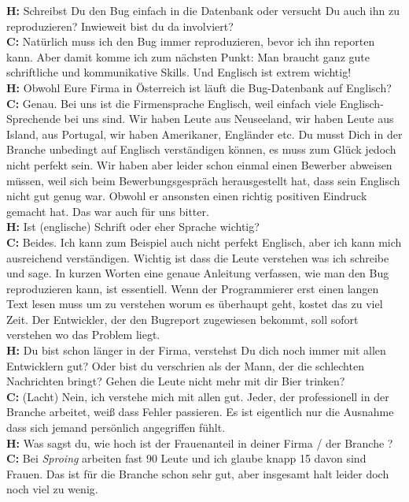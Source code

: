 \documentclass[10pt,a4paper,ngerman,twoside]{article} %
\begin{document}
\textbf{H:} Schreibst Du den Bug einfach in die Datenbank oder versucht Du auch ihn zu reproduzieren? Inwieweit bist du da involviert? \\
\textbf{C:} Natürlich muss ich den Bug immer reproduzieren, bevor ich ihn reporten kann. Aber damit komme ich zum nächsten Punkt: Man braucht ganz gute schriftliche und kommunikative Skills. Und Englisch ist extrem wichtig! \\
\textbf{H:} Obwohl Eure Firma in Österreich ist läuft die Bug-Datenbank auf Englisch?  \\
\textbf{C:} Genau. Bei uns ist die Firmensprache Englisch, weil einfach viele Englisch-Sprechende bei uns sind. Wir haben Leute aus Neuseeland, wir haben Leute aus Island, aus Portugal, wir haben Amerikaner, Engländer etc. Du musst Dich in der Branche unbedingt auf Englisch verständigen können, es muss zum Glück jedoch nicht perfekt sein. Wir haben aber leider schon einmal einen Bewerber abweisen müssen, weil sich beim Bewerbungsgespräch herausgestellt hat, dass sein Englisch nicht gut genug war. Obwohl er ansonsten einen richtig positiven Eindruck gemacht hat. Das war auch für uns bitter. \\
\textbf{H:} Ist (englische) Schrift oder eher Sprache wichtig? \\
\textbf{C:} Beides. Ich kann zum Beispiel auch nicht perfekt Englisch, aber ich kann mich ausreichend verständigen. Wichtig ist dass die Leute verstehen was ich schreibe und sage. In kurzen Worten eine genaue Anleitung verfassen, wie man den Bug reproduzieren kann, ist essentiell. Wenn der Programmierer erst einen langen Text lesen muss um zu verstehen worum es überhaupt geht, kostet das zu viel Zeit. Der Entwickler, der den Bugreport zugewiesen bekommt, soll sofort verstehen wo das Problem liegt. \\
\textbf{H:} Du bist schon länger in der Firma, verstehst Du dich noch immer mit allen Entwicklern gut? Oder bist du verschrien als der Mann, der die schlechten Nachrichten bringt? Gehen die Leute nicht mehr mit dir Bier trinken? \\
\textbf{C:} (Lacht) Nein, ich verstehe mich mit allen gut. Jeder, der professionell in der Branche arbeitet, weiß dass Fehler passieren. Es ist eigentlich nur die Ausnahme dass sich jemand persönlich angegriffen fühlt. \\
\textbf{H:} Was sagst du, wie hoch ist der Frauenanteil in deiner Firma / der Branche ? \\
\textbf{C:} Bei \textit{Sproing} arbeiten fast 90 Leute und ich glaube knapp 15 davon sind Frauen. Das ist für die Branche schon sehr gut, aber insgesamt halt leider doch noch viel zu wenig. \\
\end{document}

